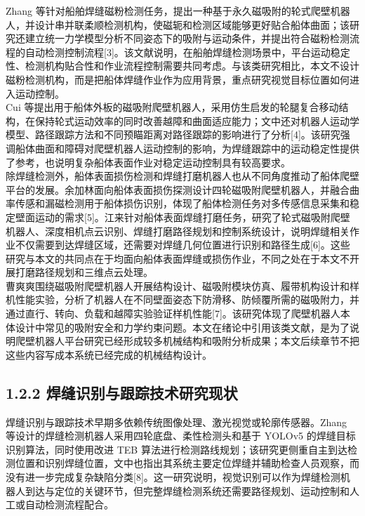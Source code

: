 \documentclass[UTF8,a4paper,12pt]{ctexrep}
\begin{document}
Zhang 等针对船舶焊缝磁粉检测任务，提出一种基于永久磁吸附的轮式爬壁机器人，并设计串并联柔顺检测机构，使磁轭和检测区域能够更好贴合船体曲面；该研究还建立统一力学模型分析不同姿态下的吸附与运动条件，并提出符合磁粉检测流程的自动检测控制流程[3]。该文献说明，在船舶焊缝检测场景中，平台运动稳定性、检测机构贴合性和作业流程控制需要共同考虑。与该类研究相比，本文不设计磁粉检测机构，而是把船体焊缝作业作为应用背景，重点研究视觉目标位置如何进入运动控制。\\

Cui 等提出用于船体外板的磁吸附爬壁机器人，采用仿生启发的轮腿复合移动结构，在保持轮式运动效率的同时改善越障和曲面适应能力；文中还对机器人运动学模型、路径跟踪方法和不同预瞄距离对路径跟踪的影响进行了分析[4]。该研究强调船体曲面和障碍对爬壁机器人运动控制的影响，为焊缝跟踪中的运动稳定性提供了参考，也说明复杂船体表面作业对稳定运动控制具有较高要求。\\

除焊缝检测外，船体表面损伤检测和焊缝打磨机器人也从不同角度推动了船体爬壁平台的发展。余加林面向船体表面损伤探测设计四轮磁吸附爬壁机器人，并融合曲率传感和漏磁检测用于船体损伤识别，体现了船体检测任务对多传感信息采集和稳定壁面运动的需求[5]。江来针对船体表面焊缝打磨任务，研究了轮式磁吸附爬壁机器人、深度相机点云识别、焊缝打磨路径规划和控制系统设计，说明焊缝相关作业不仅需要到达焊缝区域，还需要对焊缝几何位置进行识别和路径生成[6]。这些研究与本文的共同点在于均面向船体表面焊缝或损伤作业，不同之处在于本文不开展打磨路径规划和三维点云处理。\\

曹爽爽围绕磁吸附爬壁机器人开展结构设计、磁吸附模块仿真、履带机构设计和样机性能实验，分析了机器人在不同壁面姿态下防滑移、防倾覆所需的磁吸附力，并通过直行、转向、负载和越障实验验证样机性能[7]。该研究体现了爬壁机器人本体设计中常见的吸附安全和力学约束问题。本文在绪论中引用该类文献，是为了说明爬壁机器人平台研究已经形成较多机械结构和吸附分析成果；本文后续章节不把这些内容写成本系统已经完成的机械结构设计。\\

\subsection{1.2.2 焊缝识别与跟踪技术研究现状}

焊缝识别与跟踪技术早期多依赖传统图像处理、激光视觉或轮廓传感器。Zhang 等设计的焊缝检测机器人采用四轮底盘、柔性检测头和基于 YOLOv5 的焊缝目标识别算法，同时使用改进 TEB 算法进行检测路线规划；该研究更侧重自主到达检测位置和识别焊缝位置，文中也指出其系统主要定位焊缝并辅助检查人员观察，而没有进一步完成复杂缺陷分类[8]。这一研究说明，视觉识别可以作为焊缝检测机器人到达与定位的关键环节，但完整焊缝检测系统还需要路径规划、运动控制和人工或自动检测流程配合。\\
\end{document}
